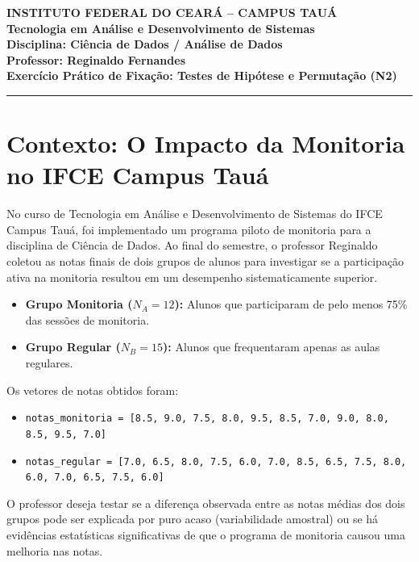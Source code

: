 \documentclass[12pt]{article}
\begin{document}
\begin{center}
    \vspace{0.5cm}
    \textbf{INSTITUTO FEDERAL DO CEARÁ -- CAMPUS TAUÁ} \\
    \textbf{Tecnologia em Análise e Desenvolvimento de Sistemas} \\
    \textbf{Disciplina: Ciência de Dados / Análise de Dados} \\
    \textbf{Professor: Reginaldo Fernandes} \\
    \vspace{0.5cm}
    \large{\textbf{Exercício Prático de Fixação: Testes de Hipótese e Permutação (N2)}}
    \vspace{0.3cm}
\end{center}

\hrule
\vspace{0.4cm}

\section*{Contexto: O Impacto da Monitoria no IFCE Campus Tauá}
No curso de Tecnologia em Análise e Desenvolvimento de Sistemas do IFCE Campus Tauá, foi implementado um programa piloto de monitoria para a disciplina de Ciência de Dados. Ao final do semestre, o professor Reginaldo coletou as notas finais de dois grupos de alunos para investigar se a participação ativa na monitoria resultou em um desempenho sistematicamente superior.

\begin{itemize}
    \item \textbf{Grupo Monitoria ($N_A = 12$):} Alunos que participaram de pelo menos 75\% das sessões de monitoria.
    \item \textbf{Grupo Regular ($N_B = 15$):} Alunos que frequentaram apenas as aulas regulares.
\end{itemize}

Os vetores de notas obtidos foram:
\begin{itemize}
    \item \lstinline|notas_monitoria = [8.5, 9.0, 7.5, 8.0, 9.5, 8.5, 7.0, 9.0, 8.0, 8.5, 9.5, 7.0]|
    \item \lstinline|notas_regular = [7.0, 6.5, 8.0, 7.5, 6.0, 7.0, 8.5, 6.5, 7.5, 8.0, 6.0, 7.0, 6.5, 7.5, 6.0]|
\end{itemize}

O professor deseja testar se a diferença observada entre as notas médias dos dois grupos pode ser explicada por puro acaso (variabilidade amostral) ou se há evidências estatísticas significativas de que o programa de monitoria causou uma melhoria nas notas.
\end{document}
